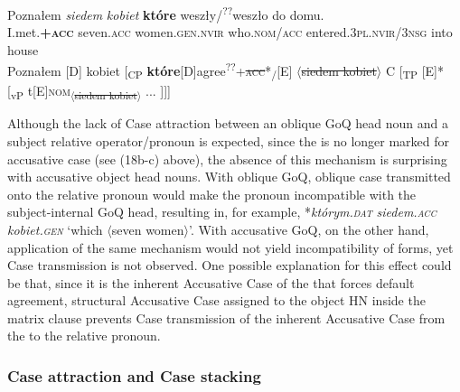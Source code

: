 \documentclass[output=paper]{langsci/langscibook}
\begin{document}
\ea\label{ex:leska:29}
\gll Poznałem \textit{siedem}     \textit{kobiet}     \textbf{które} weszły/\textsuperscript{??}weszło   do   domu.\\
     I.met.\textbf{\textsc{+acc}} seven.\textsc{acc}   women.\textsc{gen.nvir}  who.\textsc{nom/acc}    entered.\textsc{3pl.nvir/3nsg}  into house\\
\glt Poznałem [D] kobiet [\textsubscript{CP} \textbf{które}[D]{agree\textsuperscript{??}+\textsc{\sout{acc}}}*\textsubscript{\slash}[E] $\langle$\sout{siedem kobiet}$\rangle$ C [\textsubscript{TP} [E]* [\textsubscript{vP} t[E]{\footnotesize\textsc{nom}}\textsubscript{$\langle$\sout{siedem kobiet}$\rangle$} ... ]]]
\z\vspace*{\baselineskip}

Although the lack of Case attraction between an oblique GoQ head noun and a subject relative operator\slash pronoun is expected, since the  is no longer marked for accusative case (see (18b-c) above), the absence of this mechanism is surprising with accusative object head nouns. With oblique GoQ, oblique case transmitted onto the relative pronoun would make the pronoun incompatible with the subject-internal GoQ head, resulting in, for example, *\textit{którym.\textsc{dat}} \textit{siedem.\textsc{acc}} \textit{kobiet.\textsc{gen}} ‘which $\langle$seven women$\rangle$’. With accusative GoQ, on the other hand, application of the same mechanism would not yield incompatibility of forms, yet Case transmission is not observed. One possible explanation for this effect could be that, since it is the inherent Accusative Case of the  that forces default agreement, structural Accusative Case assigned to the object HN inside the matrix clause prevents Case transmission of the inherent Accusative Case from the  to the relative pronoun. 

\subsubsection{Case attraction and Case stacking}%
\end{document}
